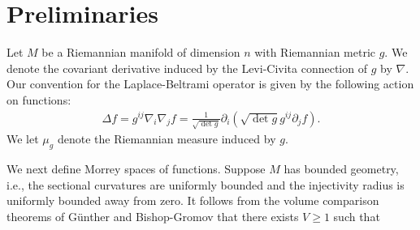 \documentclass[12pt]{amsart}
\renewcommand{\1}{{\mathbf 1}}
\theoremstyle{others}
\numberwithin{equation}{section}
\begin{document}
\section{Preliminaries}\label{section:preliminaries}
Let \(M\) be a %
Riemannian manifold of dimension \(n\) with Riemannian metric \(g\). We denote the covariant derivative induced by the Levi-Civita connection of \(g\) by \(\nabla\). Our convention for the Laplace-Beltrami operator is given by the following action on functions:
\begin{align*}
    \Delta f = g^{ij}\nabla_i \nabla_j f = \frac{1}{\sqrt{\det g}} \partial_i \left(\sqrt{\det g}g^{ij}\partial_j f\right).
\end{align*} We let \(\mu_g\) denote the Riemannian measure induced by \(g\).

\par 
We next define Morrey spaces of functions.
Suppose \(M\) has bounded geometry, i.e., the sectional curvatures are uniformly bounded and the injectivity radius is uniformly bounded away from zero.
It follows from the volume comparison theorems of G{\"u}nther and Bishop-Gromov %
that there exists \(V \geq 1\) such that 
\end{document}

